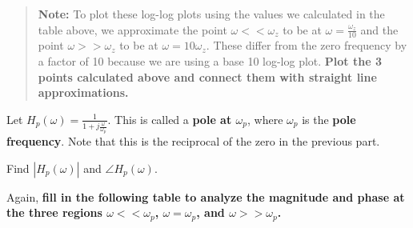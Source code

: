 \begin{enumerate}
\begin{enumerate}
    \begin{quote}
    \textbf{Note:} To plot these log-log plots using the values we calculated in the table above, we approximate the point $\omega << \omega_z$
    to be at $\omega = \frac{\omega_z}{10}$ and the point $\omega >> \omega_z$ to be at $\omega = 10\omega_z$.
    These differ from the zero frequency by a factor of 10 because we are using a base 10 log-log plot. \textbf{Plot the 3 points calculated above and connect them with straight line approximations.}
    \end{quote}

\end{enumerate}


\qitem Let $H_p(\omega) = \frac{1}{1 + j \frac{\omega}{\omega_p}}$. This is called a \textbf{pole at $\omega_p$}, where $\omega_p$ is the \textbf{pole frequency}. Note that this is the reciprocal of the zero in the previous part.
\begin{enumerate}
    \qitem Find $|H_p(\omega)|$ and $\angle H_p(\omega)$.


    \qitem Again, \textbf{fill in the following table to analyze the magnitude and phase at the three regions $\omega << \omega_p$, $\omega = \omega_p$, and $\omega >> \omega_p$.}


\end{enumerate}
\end{enumerate}
